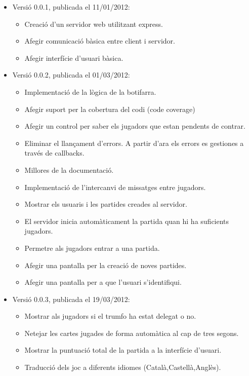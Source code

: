 \begin{itemize}
\item{Versió 0.0.1, publicada el 11/01/2012:
    \begin{itemize}
        \item{Creació d'un servidor web utilitzant express.}
        \item{Afegir comunicació bàsica entre client i servidor.}
        \item{Afegir interfície d'usuari bàsica.}
    \end{itemize}
}
\item{Versió 0.0.2, publicada el 01/03/2012: 
    \begin{itemize}
        \item{Implementació de la lògica de la botifarra.}
        \item{Afegir suport per la cobertura del codi (code coverage)}
        \item{Afegir un control per saber els jugadors que estan pendents de contrar.}
        \item{Eliminar el llançament d'errors. A partir d'ara els errors es gestiones a través de callbacks.}
        \item{Millores de la documentació.}
        \item{Implementació de l'intercanvi de missatges entre jugadors.}
        \item{Mostrar els usuaris i les partides creades al servidor.}
        \item{El servidor inicia automàticament la partida quan hi ha suficients jugadors.}
        \item{Permetre als jugadors entrar a una partida.}
        \item{Afegir una pantalla per la creació de noves partides.} 
        \item{Afegir una pantalla per a que l'usuari s'identifiqui.}
    \end{itemize}
}
\item{Versió 0.0.3, publicada el 19/03/2012: 
    \begin{itemize}
        \item{Mostrar als jugadors si el trumfo ha estat delegat o no.}
        \item{Netejar les cartes jugades de forma automàtica al cap de tres segons.}
        \item{Mostrar la puntuació total de la partida a la interfície d'usuari.}
        \item{Traducció dels joc a diferents idiomes (Català,Castellà,Anglès).}

\end{itemize}}
\end{itemize}
